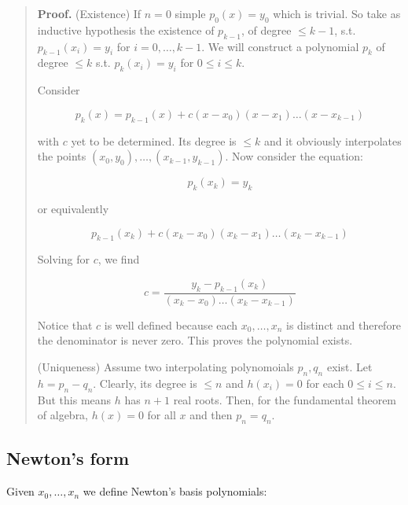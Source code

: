 \documentclass[12pt]{article}
\theoremstyle{definition}
\begin{document}
\small
\begin{quote}

\textbf{Proof.} (Existence) If $n = 0$ simple $p_0(x) = y_0$ which is trivial. So take as
inductive hypothesis the existence of $p_{k-1}$, of degree $\leq k - 1$, s.t. 
$p_{k-1}(x_i) = y_i$ for $i = 0, \ldots, k-1$. We will construct a polynomial
$p_k$ of degree $\leq k$ s.t. $p_k(x_i) = y_i$ for $0 \leq i \leq k$. 

Consider 

\begin{equation*}
    p_k(x) = p_{k-1}(x) + c(x - x_0)(x-x_1)\ldots(x-x_{k-1})
\end{equation*}

with $c$ yet to be determined. Its degree is $\leq k$ and it obviously
interpolates the points $(x_0, y_0), \ldots, (x_{k-1}, y_{k-1})$. 
Now consider the equation: 

\begin{equation*}
    p_k(x_k) = y_k
\end{equation*}

or equivalently 

\begin{equation*}
    p_{k-1}(x_k) + c(x_k - x_0)(x_k - x_1) \ldots (x_k - x_{k-1})
\end{equation*}

Solving for $c$, we find 

\begin{equation*}
    c = \frac{y_k - p_{k-1}(x_k)}{(x_k - x_0)\ldots(x_k - x_{k-1})}
\end{equation*}

Notice that $c$ is well defined because each $x_0, \ldots, x_n$ is distinct and
therefore the denominator is never zero. This proves the polynomial exists. 

(Uniqueness) Assume two interpolating polynomoials $p_n, q_n$ exist. Let $h =
p_n - q_n$. Clearly, its degree is $\leq n$ and $h(x_i) = 0$ for each $0 \leq i
\leq n$. But this means $h$ has $n+1$ real roots. Then, for the fundamental
theorem of algebra, $h(x) = 0$ for all $x$ and then $p_n = q_n$.


\end{quote}
\normalsize

\subsection{Newton's form}

Given $x_0, \ldots, x_n$ we define Newton's basis polynomials:
\end{document}
